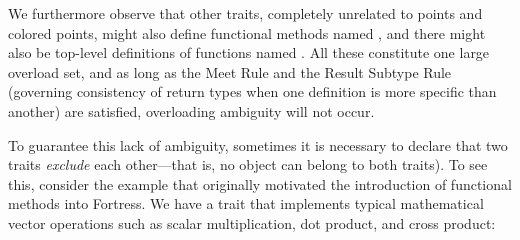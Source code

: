 We furthermore observe that other traits, completely unrelated to points
and colored points, might also define functional methods
named , and there might also be top-level
definitions of functions named .  All these constitute
one large overload set, and as long as the Meet Rule
and the Result Subtype Rule (governing consistency of return types
when one definition is more specific than another) are satisfied,
overloading ambiguity will not occur.

To guarantee this lack of ambiguity, sometimes it is necessary
to declare that two traits \emph{exclude}
each other---that is, no object can belong to both traits).
To see this, consider the example that originally motivated
the introduction of functional methods into Fortress.
We have a  trait that implements typical mathematical vector operations
such as scalar multiplication, dot product, and cross product:
